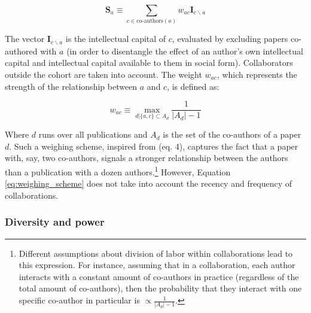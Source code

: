 \documentclass{article}
\begin{document}
\begin{equation}
    \bm{S}_{a} \equiv \sum_{c \in \text{co-authors}(a)} w_{ac} \bm{I}_{c\backslash a}
\end{equation}

The vector $\bm{I}_{c\backslash a}$ is the intellectual capital of $c$, evaluated by excluding papers co-authored with $a$ (in order to disentangle the effect of an author's own intellectual capital and intellectual capital available to them in social form). Collaborators outside the cohort are taken into account. The weight $w_{ac}$, which represents the strength of the relationship between $a$ and $c$, is defined as:

\begin{equation}
    w_{ac} \equiv \max_{d|\{a,c\} \subset A_d} \frac{1}{|A_d|-1}
    \label{eq:weighing_scheme}
\end{equation}

Where $d$ runs over all publications and $A_d$ is the set of the co-authors of a paper $d$. Such a weighing scheme, inspired from \citealt{Newman2004} (eq. 4), captures the fact that a paper with, say, two co-authors, signals a stronger relationship between the authors than a publication with a dozen authors.\footnote{Different assumptions about division of labor within collaborations lead to this expression. For instance, assuming that in a collaboration, each author interacts with a constant amount of co-authors in practice (regardless of the total amount of co-authors), then the probability that they interact with one specific co-author in particular is $\propto \frac{1}{|A_d|-1}$. 
} However, Equation \eqref{eq:weighing_scheme} does not take into account the recency and frequency of collaborations.

\subsubsection{Diversity and power}
\end{document}
